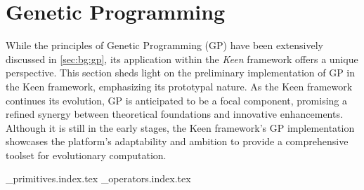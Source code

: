 
\section{Genetic Programming}
\label{sec:keen:gp}
  While the principles of Genetic Programming (GP) have been extensively 
  discussed in \vref{sec:bg:gp}, its application within the \textit{Keen} 
  framework offers a unique perspective. This section sheds light on the 
  preliminary implementation of GP in the Keen framework, emphasizing its 
  prototypal nature. As the Keen framework continues its evolution, GP is 
  anticipated to be a focal component, promising a refined synergy between 
  theoretical foundations and innovative enhancements. Although it is still in 
  the early stages, the Keen framework's GP implementation showcases the 
  platform's adaptability and ambition to provide a comprehensive toolset for 
  evolutionary computation.

  {_primitives.index.tex}
  {_operators.index.tex}